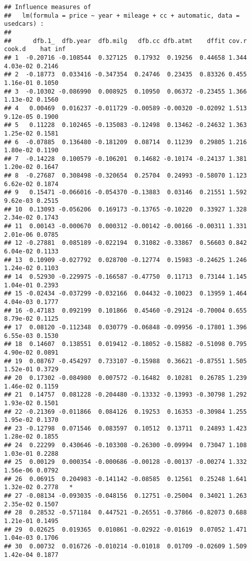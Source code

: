 \documentclass[
]{book}
\begin{document}
\begin{verbatim}
## Influence measures of
##   lm(formula = price ~ year + mileage + cc + automatic, data = usedcars) :
## 
##      dfb.1_  dfb.year  dfb.milg   dfb.cc dfb.atmt    dffit cov.r   cook.d    hat inf
## 1  -0.20716 -0.108544  0.327125  0.17932  0.19256  0.44658 1.344 4.03e-02 0.2146    
## 2  -0.18773  0.033416 -0.347354  0.24746  0.23435  0.83326 0.455 1.16e-01 0.1050    
## 3  -0.10302 -0.086990  0.008925  0.10950  0.06372 -0.23455 1.366 1.13e-02 0.1560    
## 4   0.00469  0.016237 -0.011729 -0.00589 -0.00320 -0.02092 1.513 9.12e-05 0.1900    
## 5   0.11228  0.102465 -0.135083 -0.12498  0.13462 -0.24632 1.363 1.25e-02 0.1581    
## 6  -0.07885  0.136480 -0.181209  0.08714  0.11239  0.29805 1.216 1.80e-02 0.1190    
## 7  -0.14228  0.100579 -0.106201  0.14682 -0.10174 -0.24137 1.381 1.20e-02 0.1647    
## 8  -0.27687  0.308498 -0.320654  0.25704  0.24993 -0.58070 1.123 6.62e-02 0.1874    
## 9   0.15471 -0.066016 -0.054370 -0.13883  0.03146  0.21551 1.592 9.62e-03 0.2515    
## 10  0.13093 -0.056206  0.169173 -0.13765 -0.10220  0.33927 1.328 2.34e-02 0.1743    
## 11  0.00143 -0.000670  0.000312 -0.00142 -0.00166 -0.00311 1.331 2.01e-06 0.0785    
## 12 -0.27881  0.085189 -0.022194  0.31082 -0.33867  0.56603 0.842 6.04e-02 0.1133    
## 13  0.10909 -0.027792  0.028700 -0.12774  0.15983 -0.24625 1.246 1.24e-02 0.1103    
## 14  0.52930 -0.229975 -0.166587 -0.47750  0.11713  0.73144 1.145 1.04e-01 0.2393    
## 15 -0.02434 -0.037299 -0.032166  0.04432 -0.10023  0.13959 1.464 4.04e-03 0.1777    
## 16 -0.47183  0.092199  0.101866  0.45460 -0.29124 -0.70004 0.655 8.79e-02 0.1125    
## 17  0.08120 -0.112348  0.030779 -0.06848 -0.09956 -0.17801 1.396 6.55e-03 0.1530    
## 18  0.14607  0.138551  0.019412 -0.18052 -0.15882 -0.51098 0.795 4.90e-02 0.0891    
## 19  0.08767 -0.454297  0.733107 -0.15988  0.36621 -0.87551 1.505 1.52e-01 0.3729    
## 20  0.17302 -0.084980  0.007572 -0.16482  0.10281  0.26785 1.239 1.46e-02 0.1159    
## 21  0.14757  0.081228 -0.204480 -0.13332 -0.13993 -0.30798 1.292 1.93e-02 0.1501    
## 22 -0.21369 -0.011866  0.084126  0.19253  0.16353 -0.30984 1.255 1.95e-02 0.1370    
## 23 -0.12798  0.071546  0.083597  0.10512  0.13711  0.24893 1.423 1.28e-02 0.1855    
## 24  0.22299  0.430646 -0.103308 -0.26300 -0.09994  0.73047 1.108 1.03e-01 0.2288    
## 25  0.00129  0.000354 -0.000686 -0.00128 -0.00137 -0.00274 1.332 1.56e-06 0.0792    
## 26  0.06915  0.204983 -0.141142 -0.08585  0.12561  0.25248 1.641 1.32e-02 0.2778   *
## 27 -0.08134 -0.093035 -0.048156  0.12751 -0.25004  0.34021 1.263 2.35e-02 0.1507    
## 28  0.28532 -0.571184  0.447521 -0.26551 -0.37866 -0.82073 0.688 1.21e-01 0.1495    
## 29  0.02625  0.019365  0.010861 -0.02922 -0.01619  0.07052 1.471 1.04e-03 0.1706    
## 30  0.00732  0.016726 -0.010214 -0.01018  0.01709 -0.02609 1.509 1.42e-04 0.1877
\end{verbatim}
\end{document}
